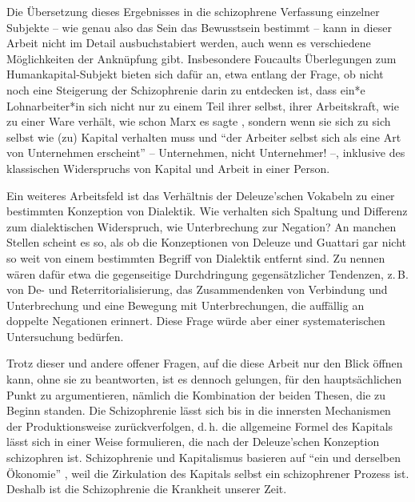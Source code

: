 \documentclass[12pt,
               paper=a4,
               twoside=false,
               onehalfspacing,
               bibliography=totoc,
               toc=graduated,
               ]{scrartcl}
\newcommand{\pc}[2]{\parencite[#1]{#2}}
\newcommand{\vgl}[2]{\parencite[vgl.][#1]{#2}}
\begin{document}
Die Übersetzung dieses Ergebnisses in die schizophrene Verfassung
einzelner Subjekte -- wie genau also das Sein das Bewusstsein bestimmt
-- kann in dieser Arbeit nicht im Detail ausbuchstabiert werden, auch
wenn es verschiedene Möglichkeiten der Anknüpfung gibt. Insbesondere
Foucaults Überlegungen zum Humankapital-Subjekt bieten sich dafür an,
etwa entlang der Frage, ob nicht noch eine Steigerung der
Schizophrenie darin zu entdecken ist, dass ein*e Lohnarbeiter*in sich
nicht nur zu einem Teil ihrer selbst, ihrer Arbeitskraft, wie zu einer
Ware verhält, wie schon Marx es sagte \vgl{182}{kap}, sondern wenn sie
sich zu sich selbst wie (zu) Kapital verhalten muss und "`der Arbeiter
selbst sich als eine Art von Unternehmen erscheint"' \pc{313}{gbp} --
Unternehmen, nicht Unternehmer! --, inklusive des klassischen
Widerspruchs von Kapital und Arbeit in einer Person.

Ein weiteres Arbeitsfeld ist das Verhältnis der Deleuze'schen Vokabeln
zu einer bestimmten Konzeption von Dialektik. Wie verhalten sich
Spaltung und Differenz zum dialektischen Widerspruch, wie
Unterbrechung zur Negation? An manchen Stellen scheint es so, als ob
die Konzeptionen von Deleuze und Guattari gar nicht so weit von einem
bestimmten Begriff von Dialektik entfernt sind. Zu nennen wären dafür
etwa die gegenseitige Durchdringung gegensätzlicher Tendenzen, z.\,B.
von De- und Reterritorialisierung, das Zusammendenken von Verbindung
und Unterbrechung und eine Bewegung mit Unterbrechungen, die auffällig
an doppelte Negationen erinnert. Diese Frage würde aber einer
systematerischen Untersuchung bedürfen.

Trotz dieser und andere offener Fragen, auf die diese Arbeit nur den
Blick öffnen kann, ohne sie zu beantworten, ist es dennoch gelungen,
für den hauptsächlichen Punkt zu argumentieren, nämlich die
Kombination der beiden Thesen, die zu Beginn standen. Die
Schizophrenie lässt sich bis in die innersten Mechanismen der
Produktionsweise zurückverfolgen, d.\,h. die allgemeine Formel des
Kapitals lässt sich in einer Weise formulieren, die nach der
Deleuze'schen Konzeption schizophren ist. Schizophrenie und
Kapitalismus basieren auf "`ein und derselben Ökonomie"' \pc{315}{ao},
weil die Zirkulation des Kapitals selbst ein schizophrener Prozess
ist. Deshalb ist die Schizophrenie die Krankheit unserer Zeit.
\end{document}
